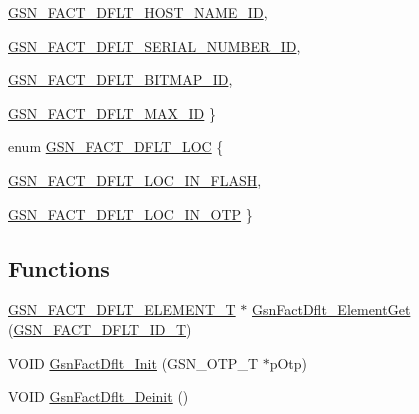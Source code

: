 \begin{DoxyCompactItemize}
\par
\hyperlink{a00499_a36c3dc2e14b83eabfa65c84a1b36753fa94c28db1b7c165687f4f410421bdb4e1}{GSN\_\-FACT\_\-DFLT\_\-HOST\_\-NAME\_\-ID}, 
\par
\hyperlink{a00499_a36c3dc2e14b83eabfa65c84a1b36753fab1a13e90db56cab8ce7a80c2a104cbc7}{GSN\_\-FACT\_\-DFLT\_\-SERIAL\_\-NUMBER\_\-ID}, 
\par
\hyperlink{a00499_a36c3dc2e14b83eabfa65c84a1b36753fa39cf02cfe6b0db37d3e1e4e4eabf36ff}{GSN\_\-FACT\_\-DFLT\_\-BITMAP\_\-ID}, 
\par
\hyperlink{a00499_a36c3dc2e14b83eabfa65c84a1b36753fa9df6f9082b705e35d5400a7971c06305}{GSN\_\-FACT\_\-DFLT\_\-MAX\_\-ID}
 \}
\item 
enum \hyperlink{a00499_a82305aaac9039404aaedce035f4d4445}{GSN\_\-FACT\_\-DFLT\_\-LOC} \{ \par
\hyperlink{a00499_a82305aaac9039404aaedce035f4d4445a0c5c156ba720578fbb70d46b5a1ce557}{GSN\_\-FACT\_\-DFLT\_\-LOC\_\-IN\_\-FLASH}, 
\par
\hyperlink{a00499_a82305aaac9039404aaedce035f4d4445aa6f2960e329395172b377dc0bcac3b72}{GSN\_\-FACT\_\-DFLT\_\-LOC\_\-IN\_\-OTP}
 \}
\end{DoxyCompactItemize}
\subsection*{Functions}
\begin{DoxyCompactItemize}
\item 
\hyperlink{a00073}{GSN\_\-FACT\_\-DFLT\_\-ELEMENT\_\-T} $\ast$ \hyperlink{a00499_a5cc096066de23e6ffc9b0ff9cf23910f}{GsnFactDflt\_\-ElementGet} (\hyperlink{a00499_af0b40f06ec607fa54127f161de39a863}{GSN\_\-FACT\_\-DFLT\_\-ID\_\-T})
\item 
VOID \hyperlink{a00499_af00da2e4909d1bb3d6dcf05b1415ff35}{GsnFactDflt\_\-Init} (GSN\_\-OTP\_\-T $\ast$pOtp)
\item 
VOID \hyperlink{a00499_ad834413b7d5827ac1f15ebc5329667d7}{GsnFactDflt\_\-Deinit} ()
\end{DoxyCompactItemize}


